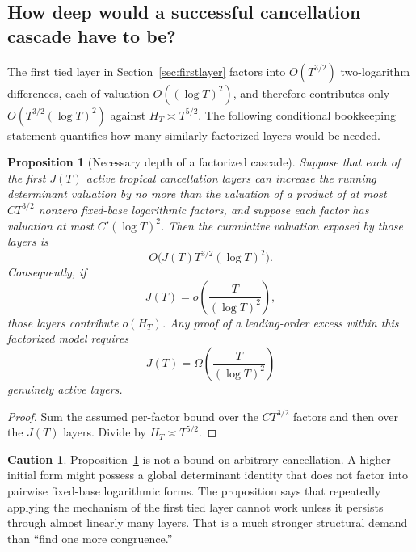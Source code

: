 \documentclass[11pt,oneside]{article}
\newtheorem{proposition}[theorem]{Proposition}
\theoremstyle{definition}
\newtheorem{warning}[theorem]{Caution}
\theoremstyle{remark}
\begin{document}
\subsection{How deep would a successful cancellation cascade have to be?}
\label{sec:c3-cascade-depth}

The first tied layer in Section~\ref{sec:firstlayer} factors into
$O(T^{3/2})$ two-logarithm differences, each of valuation
$O((\log T)^2)$, and therefore contributes only
$O(T^{3/2}(\log T)^2)$ against $H_T\asymp T^{5/2}$.  The following conditional bookkeeping
statement quantifies how many similarly factorized layers would be needed.

\begin{proposition}[Necessary depth of a factorized cascade]
\label{prop:c3-cascade-depth}
Suppose that each of the first $J(T)$ active tropical cancellation layers can increase the
running determinant valuation by no more than the valuation of a product of at most
$CT^{3/2}$ nonzero fixed-base logarithmic factors, and suppose each factor has valuation at
most $C'(\log T)^2$.  Then the cumulative valuation exposed by those layers is
\begin{equation}\label{eq:c3-cascade-bound}
 O\bigl(J(T)T^{3/2}(\log T)^2\bigr).
\end{equation}
Consequently, if
\[
 J(T)=o\left(\frac{T}{(\log T)^2}\right),
\]
those layers contribute $o(H_T)$.  Any proof of a leading-order excess within this factorized
model requires
\begin{equation}\label{eq:c3-cascade-necessary}
 J(T)=\Omega\left(\frac{T}{(\log T)^2}\right)
\end{equation}
genuinely active layers.
\end{proposition}

\begin{proof}
Sum the assumed per-factor bound over the $CT^{3/2}$ factors and then over the $J(T)$ layers.
Divide by $H_T\asymp T^{5/2}$.
\end{proof}

\begin{warning}
Proposition~\ref{prop:c3-cascade-depth} is not a bound on arbitrary cancellation.  A higher
initial form might possess a global determinant identity that does not factor into pairwise
fixed-base logarithmic forms.  The proposition says that repeatedly applying the mechanism of
the first tied layer cannot work unless it persists through almost linearly many layers.
That is a much stronger structural demand than ``find one more congruence.''
\end{warning}
\end{document}
